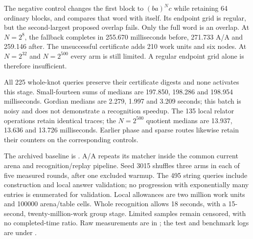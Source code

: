 The negative control changes the first block to $(ba)^Nc$ while retaining
64 ordinary blocks, and compares that word with itself. Its endpoint grid
is regular, but the second-largest proposed overlap fails. Only the full
word is an overlap. At $N=2^8$, the fallback completes in 255.670 milliseconds
before, 271.733 A/A and 259.146 after. The unsuccessful certificate adds
210 work units and six nodes. At $N=2^{32}$ and $N=2^{500}$ every arm is
still limited. A regular endpoint grid alone is therefore insufficient.

All 225 whole-knot queries preserve their certificate digests and none
activates this stage. Small-fourteen sums of medians are 197.850, 198.286
and 198.954 milliseconds. Gordian medians are 2.279, 1.997 and 3.209 seconds;
this batch is noisy and does not demonstrate a recognition speedup.
The 135 local relator operations retain identical traces; the $N=2^{500}$
quotient medians are 13.937, 13.636 and 13.726 milliseconds. Earlier phase
and sparse routes likewise retain their counters on the corresponding controls.

The archived baseline is . A/A repeats its matcher inside
the common current arena and recognition/replay pipeline. Seed 3015 shuffles
three arms in each of five measured rounds, after one excluded warmup.
The 495 string queries include construction and local answer validation;
no progression with exponentially many entries is enumerated for validation.
Local allowances are two million work units and 100000 arena/table cells.
Whole recognition allows 18 seconds, with a 15-second, twenty-million-work
group stage. Limited samples remain censored, with no completed-time ratio.
Raw measurements are in ;
the test and benchmark logs are under .
